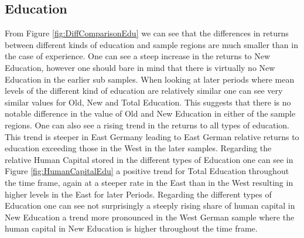 \subsection{Education}
From Figure \ref{fig:DiffComparisonEdu} we can see that the differences in returns between different kinds of education and sample regions are much smaller than in the case of experience. One can see a steep increase in the returns to New Education, however one should bare in mind that there is virtually no New Education in the earlier sub samples. When looking at later periods where mean levels of the different kind of education are relatively similar one can see very similar values for Old, New and Total Education. This suggests that there is no notable difference in the value of Old and New Education in either of the sample regions. One can also see a rising trend in the returns to all types of education. This trend is steeper in East Germany leading to East German relative returns to education exceeding those in the West in the later samples. Regarding the relative Human Capital stored in the different types of Education one can see in Figure \ref{fig:HumanCapitalEdu} a positive trend for Total Education throughout the time frame, again at a steeper rate in the East than in the West resulting in higher levels in the East for later Periods. Regarding the different types of Education one can see not surprisingly a steeply rising share of human capital  in New Education a trend more pronounced in the West German sample where the human capital in New Education is higher throughout the time frame. 

